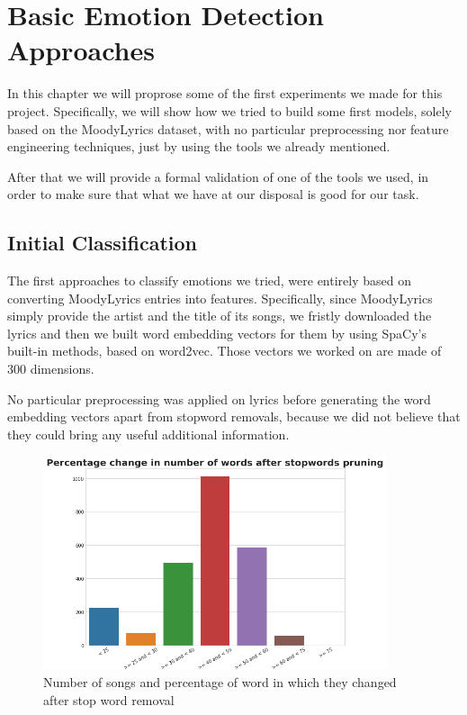 \chapter{Basic Emotion Detection Approaches}

In this chapter we will proprose some of the first experiments we made for this
project. Specifically, we will show how we tried to build some first models, solely 
based on the MoodyLyrics dataset, with no particular preprocessing nor feature
engineering techniques, just by using the tools we already mentioned.

After that we will provide a formal validation of one of the tools we used, in
order to make sure that what we have at our disposal is good for our task.

\section{Initial Classification}

The first approaches to classify emotions we tried, were entirely based on converting
MoodyLyrics entries into features. Specifically, since MoodyLyrics simply provide the
artist and the title of its songs, we fristly downloaded the lyrics and then we built
word embedding vectors for them by using SpaCy's built-in methods, based on word2vec.
Those vectors we worked on are made of 300 dimensions.

No particular preprocessing was applied on lyrics before generating the word embedding
vectors apart from stopword removals, because we did not believe that they could bring
any useful additional information.

\begin{figure}
  \centering
  \includegraphics[width=0.9\textwidth]{./chapters/chapter4/images/percentage-change.png}
  \caption{Number of songs and percentage of word in which they changed after stop word removal}
  \label{fig:ml-percentage-change}
\end{figure}


